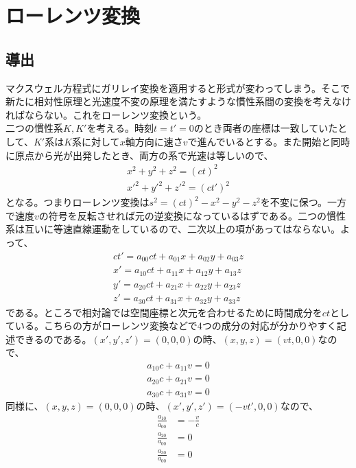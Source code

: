 \section{ローレンツ変換}

\subsection{導出}
    マクスウェル方程式にガリレイ変換を適用すると形式が変わってしまう。そこで新たに相対性原理と光速度不変の原理を満たすような慣性系間の変換を考えなければならない。これをローレンツ変換という。\\
    二つの慣性系$K,K'$を考える。時刻$t=t'=0$のとき両者の座標は一致していたとして、$K'$系は$K$系に対して$x$軸方向に速さ$v$で進んでいるとする。また開始と同時に原点から光が出発したとき、両方の系で光速は等しいので、
    \begin{align*}
        x^2+y^2+z^2 = (ct)^2\\
        x'^2+y'^2+z'^2 = (ct')^2
    \end{align*}
    となる。つまりローレンツ変換は$s^2=(ct)^2-x^2-y^2-z^2$を不変に保つ。一方で速度$v$の符号を反転させれば元の逆変換になっているはずである。二つの慣性系は互いに等速直線運動をしているので、二次以上の項があってはならない。よって、
    \begin{align*}
        ct' = a_{00}ct + a_{01}x + a_{02}y + a_{03}z\\
        x' = a_{10}ct + a_{11}x + a_{12}y + a_{13}z\\
        y' = a_{20}ct + a_{21}x + a_{22}y + a_{23}z\\
        z' = a_{30}ct + a_{31}x + a_{32}y + a_{33}z
    \end{align*}
    である。ところで相対論では空間座標と次元を合わせるために時間成分を$ct$としている。こちらの方がローレンツ変換などで4つの成分の対応が分かりやすく記述できるのである。$(x',y',z')=(0,0,0)の時、(x,y,z)=(vt,0,0)$なので、
    \begin{align*}
        a_{10}c+a_{11}v = 0\\
        a_{20}c+a_{21}v = 0\\
        a_{30}c+a_{31}v = 0
    \end{align*}
    同様に、$(x,y,z)=(0,0,0)の時、(x',y',z')=(-vt',0,0)$なので、
    \begin{align*}
        \frac{a_{10}}{a_{00}} &= -\frac{v}{c}\\
        \frac{a_{20}}{a_{00}} &= 0\\
        \frac{a_{30}}{a_{00}} &= 0
    \end{align*}
